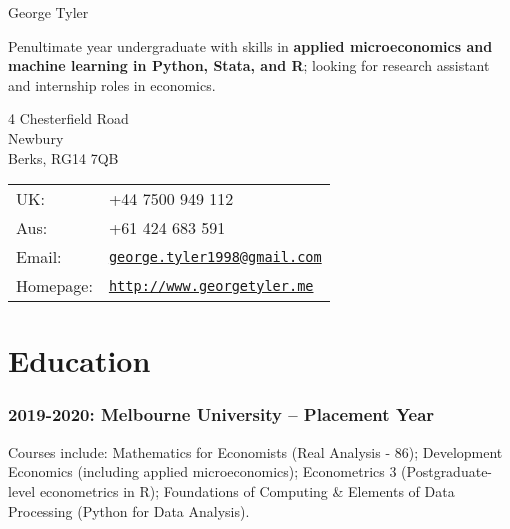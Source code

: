 \documentclass[letterpaper]{article}
\def\name{George Tyler}
\renewenvironment{itemize}{
  \begin{list}{}{
    \setlength{\leftmargin}{1.5em}
  }
}{
  \end{list}
}
\begin{document}
{\huge \name}


\vspace{0.25in}

Penultimate year undergraduate with skills in \textbf{applied microeconomics and machine learning in Python, Stata, and R}; looking for research assistant and internship roles in economics.

\vspace{0.25in}

\begin{minipage}{0.45\linewidth}
  4 Chesterfield Road \\
  Newbury \\
  Berks, RG14 7QB
\end{minipage}
\begin{minipage}{0.45\linewidth}
  \begin{tabular}{ll}
    UK: & +44 7500 949 112 \\
    Aus: &  +61 424 683 591 \\
    Email: & \href{mailto:george.tyler1998@gmail.com}{\tt george.tyler1998@gmail.com} \\
    Homepage: & \href{http://www.georgetyler.me}{\tt http://www.georgetyler.me} \\
  \end{tabular}
\end{minipage}





\section*{Education}

\subsubsection*{2019-2020: Melbourne University – Placement Year}
  Courses include: Mathematics for Economists (Real Analysis - 86); Development Economics (including applied microeconomics); Econometrics 3 (Postgraduate-level econometrics in R); Foundations of Computing \& Elements of Data Processing (Python for Data Analysis).
\end{document}
